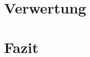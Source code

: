 \documentclass[twoside]{article}
\begin{document}
\begin{multicols}{2}
\section{Verwertung}

\section{Fazit}


\end{multicols}

\titleformat{\section}[block]{\large\scshape\centering{}}{}{1em}{}



\end{document}
